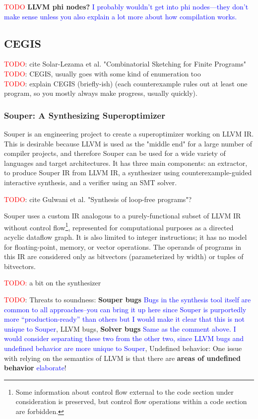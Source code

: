 \documentclass[12pt,twoside]{reedthesis}
\newcommand{\red}[1]{\textcolor{red}{#1}}
\newcommand{\comment}[2]{\textbf{#1} \textcolor{blue}{#2}}
\begin{document}
\red{TODO} \comment{LLVM phi nodes?}{I probably wouldn't get into phi nodes---they don't make sense unless you also explain a lot more about how compilation works.}

\subsection{CEGIS}
    \red{TODO}: cite Solar-Lezama et al. "Combinatorial Sketching for Finite Programs" \cite{solar-lezama2006sketch}
\\  \red{TODO}: CEGIS, usually goes with some kind of enumeration too
\\  \red{TODO}: explain CEGIS (briefly-ish) (each counterexample rules out at least one program, so you mostly always make progress, usually quickly).

\subsubsection{Souper: A Synthesizing Superoptimizer}
Souper \cite{sasnauskas2017souper} is an engineering project to create a superoptimizer working on LLVM IR.
This is desirable because LLVM is used as the "middle end" for a large number of compiler projects, and therefore Souper can be used for a wide variety of languages and target architectures.
It has three main components:
    an extractor, to produce Souper IR from LLVM IR,
    a synthesizer using counterexample-guided interactive synthesis,
    and a verifier using an SMT solver.
    
    \red{TODO}: cite Gulwani et al. "Synthesis of loop-free programs"?
    
Souper uses a custom IR analogous to a purely-functional subset of LLVM IR without control flow\footnote{Some information about control flow external to the code section under consideration is preserved, but control flow operations within a code section are forbidden.}, represented for computational purposes as a directed acyclic dataflow graph.
It is also limited to integer instructions; it has no model for floating-point, memory, or vector operations.
The operands of programs in this IR are considered only as bitvectors (parameterized by width) or tuples of bitvectors.
    
    \red{TODO:} a bit on the synthesizer
    
    \red{TODO}: Threats to soundness:
        \comment{Souper bugs}{Bugs in the synthesis tool itself are common to all approaches--you can bring it up here since Souper is purportedly more ``production-ready'' than others but I would make it clear that this is not unique to Souper},
        LLVM bugs,
        \comment{Solver bugs}{Same as the comment above. I would consider separating these two from the other two, since LLVM bugs and undefined behavior are more unique to Souper},
        Undefined behavior: One issue with relying on the semantics of LLVM is that there are \comment{areas of undefined behavior}{elaborate}!
\end{document}
